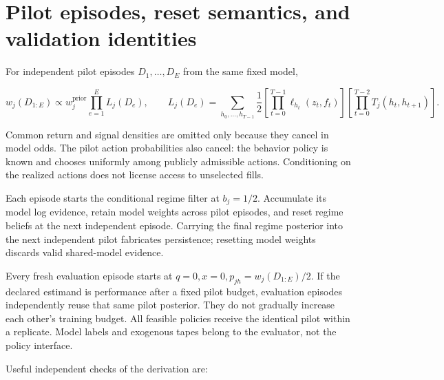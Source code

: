 \documentclass[10pt,a4paper]{article}
\begin{document}
\section{Pilot episodes, reset semantics, and validation identities}

For independent pilot episodes $D_1,\ldots,D_E$ from the same fixed model,

\begin{equation}
w_j(D_{1:E})\propto w_j^{\mathrm{prior}}
\prod_{e=1}^E L_j(D_e),\qquad
L_j(D_e)=\sum_{h_0,\ldots,h_{T-1}}
\frac12\left[\prod_{t=0}^{T-1}\ell_{h_t}(z_t,f_t)\right]
\left[\prod_{t=0}^{T-2}T_j(h_t,h_{t+1})\right].
\tag{33}
\end{equation}

Common return and signal densities are omitted only because they cancel in
model odds. The pilot action probabilities also cancel: the behavior policy
is known and chooses uniformly among publicly admissible actions. Conditioning
on the realized actions does not license access to unselected fills.

Each episode starts the conditional regime filter at $b_j=1/2$.
Accumulate its model log evidence, retain model weights across pilot episodes,
and reset regime beliefs at the next independent episode. Carrying the final
regime posterior into the next independent pilot fabricates persistence;
resetting model weights discards valid shared-model evidence.

Every fresh evaluation episode starts at
$q=0,x=0,p_{jh}=w_j(D_{1:E})/2$. If the declared estimand is performance
after a fixed pilot budget, evaluation episodes independently reuse that same
pilot posterior. They do not gradually increase each other's training budget.
All feasible policies receive the identical pilot within a replicate. Model
labels and exogenous tapes belong to the evaluator, not the policy interface.

Useful independent checks of the derivation are:
\end{document}
